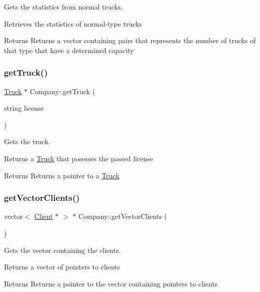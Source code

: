 Gets the statistics from normal trucks. 

Retrieves the statistics of normal-\/type trucks

\begin{DoxyReturn}{Returns}
Returns a vector containing pairs that represents the number of trucks of that type that have a determined capacity 
\end{DoxyReturn}
\mbox{\label{class_company_acb9c7285e4ca619899017bd1221a1d27}} 
\subsubsection{\texorpdfstring{get\+Truck()}{getTruck()}}
{\footnotesize\ttfamily \hyperlink{class_truck}{Truck} $\ast$ Company\+::get\+Truck (\begin{DoxyParamCaption}\item[{string}]{license }\end{DoxyParamCaption})}



Gets the truck. 

Returns a \hyperlink{class_truck}{Truck} that posesses the passed license

\begin{DoxyReturn}{Returns}
Returns a pointer to a \hyperlink{class_truck}{Truck} 
\end{DoxyReturn}
\mbox{\label{class_company_a16693c2e4bf9a932e15926c37c21485f}} 
\subsubsection{\texorpdfstring{get\+Vector\+Clients()}{getVectorClients()}}
{\footnotesize\ttfamily vector$<$ \hyperlink{class_client}{Client} $\ast$ $>$ $\ast$ Company\+::get\+Vector\+Clients (\begin{DoxyParamCaption}{ }\end{DoxyParamCaption})}



Gets the vector containing the clients. 

Returns a vector of pointers to clients

\begin{DoxyReturn}{Returns}
Returns a pointer to the vector containing pointers to clients 
\end{DoxyReturn}
\mbox{\label{class_company_ab018a747472dbb17d07e85d17dc17912}} 
